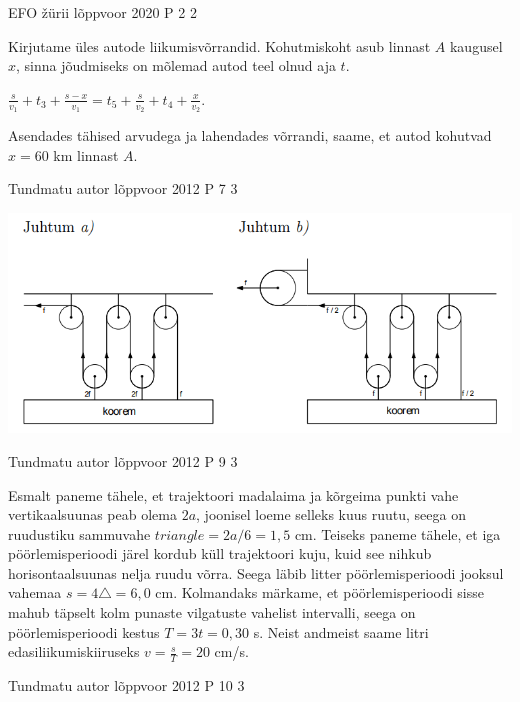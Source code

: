 \documentclass[11pt]{article}
\begin{document}
{%
{EFO žürii} %
{lõppvoor} %
{2020} %
{P 2} %
{2} %
{

\ifSolution
Kirjutame üles autode liikumisvõrrandid. Kohutmiskoht asub linnast $A$ kaugusel $x$, sinna jõudmiseks on mõlemad autod teel olnud aja $t$.
\begin{center}
$\frac{s}{v_1} + t_3 + \frac{s - x}{v_1} = t_5 + \frac{s}{v_2} + t_4 + \frac{x}{v_2}$.
\end{center}
Asendades tähised arvudega ja lahendades võrrandi, saame, et autod kohutvad $x = 60$ km linnast $A$.
\fi
}


{Tundmatu autor} %
{lõppvoor} %
{2012} %
{P 7} %
{3} %
{

\ifSolution
\begin{center}
	\includegraphics[width=0.5\linewidth]{2012-v3p-07-lah.PNG}
\end{center}
\fi
}

{Tundmatu autor} %
{lõppvoor} %
{2012} %
{P 9} %
{3} %
{

\ifSolution
Esmalt paneme tähele, et trajektoori madalaima ja kõrgeima punkti vahe vertikaalsuunas peab olema $2a$, joonisel loeme selleks kuus ruutu, seega on ruudustiku sammuvahe $triangle = 2a/6 = 1,5$ cm. Teiseks paneme tähele, et iga pöörlemisperioodi järel kordub küll trajektoori kuju, kuid see nihkub horisontaalsuunas nelja ruudu võrra. Seega läbib litter pöörlemisperioodi jooksul vahemaa $s = 4\triangle = 6,0$ cm. Kolmandaks märkame, et pöörlemisperioodi sisse mahub täpselt kolm punaste vilgatuste vahelist intervalli, seega on pöörlemisperioodi kestus $T = 3t = 0,30$ s. Neist andmeist saame litri edasiliikumiskiiruseks $v = \frac{s}{T} = 20$ cm/s.
\fi
}


{Tundmatu autor} %
{lõppvoor} %
{2012} %
{P 10} %
{3} %
{

}}
\end{document}
